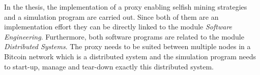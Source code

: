 \documentclass{scrartcl}
\begin{document}
In the thesis, the implementation of a proxy enabling selfish mining strategies and a simulation program are carried out.
Since both of them are an implementation effort they can be directly linked to the module \textit{Software Engineering}.
Furthermore, both software programs are related to the module \textit{Distributed Systems}.
The proxy needs to be suited between multiple nodes in a Bitcoin network which is a distributed system and the simulation program needs to start-up, manage and tear-down exactly this distributed system.


\end{document}
